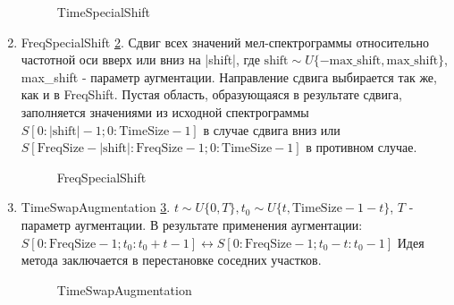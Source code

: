 \documentclass[12pt, fleqn]{article}
\begin{document}
\begin{enumerate}
\begin{figure}[h]
			\caption{TimeSpecialShift}
			\label{fig:i14}
		\end{figure}
		\item FreqSpecialShift \ref{fig:i15}. \newline
		Сдвиг всех значений мел-спектрограммы относительно частотной оси вверх или вниз на |shift|, где $\text{shift} \sim U\{-\text{max\_shift}, \text{max\_shift}\}$, max\_shift - параметр аугментации. Направление сдвига выбирается так же, как и в FreqShift. Пустая область, образующаяся в результате сдвига, заполняется значениями из исходной спектрограммы $S[0: |\text{shift}| - 1; 0: \text{TimeSize} - 1]$ в случае сдвига вниз или \newline $S[\text{FreqSize} - |\text{shift}| : \text{FreqSize} - 1; 0: \text{TimeSize} - 1]$ в противном случае.
		\begin{figure}[h]
			\caption{FreqSpecialShift}
			\label{fig:i15}
		\end{figure}
		\item TimeSwapAugmentation \ref{fig:i2}. \newline
		$t \sim U\{0, T\}, t_0 \sim U\{t, \text{TimeSize} - 1 - t\}$, $T$ - параметр аугментации. \newline
		В результате применения аугментации: \newline
	    $S[0:\text{FreqSize} - 1; t_0: t_0 + t - 1] \leftrightarrow S[0:\text{FreqSize} - 1; t_0 - t: t_0 - 1]$ \newline Идея метода заключается в перестановке соседних участков.
		\begin{figure}[h]
			\caption{TimeSwapAugmentation}
			\label{fig:i2}
		\end{figure}
		

\end{enumerate}
\end{document}
